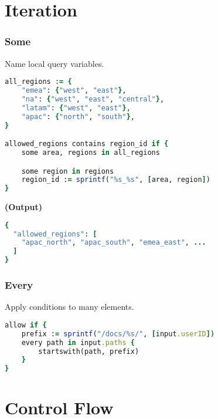 \documentclass[twocolumn]{article}
\begin{document}
\section*{Iteration  }




\vspace{-1em}
\subsubsection*{Some}


\footnotesize{Name local query variables.}


\begin{lstlisting}[language=Ruby]
all_regions := {
	"emea": {"west", "east"},
	"na": {"west", "east", "central"},
	"latam": {"west", "east"},
	"apac": {"north", "south"},
}

allowed_regions contains region_id if {
	some area, regions in all_regions

	some region in regions
	region_id := sprintf("%s_%s", [area, region])
}
\end{lstlisting}



\textbf{\tiny{(Output)}}
\begin{lstlisting}[language=Ruby]
{
  "allowed_regions": [
    "apac_north", "apac_south", "emea_east", ...
  ]
}
\end{lstlisting}



\vspace{-1em}
\subsubsection*{Every}


\footnotesize{Apply conditions to many elements.}


\begin{lstlisting}[language=Ruby]
allow if {
	prefix := sprintf("/docs/%s/", [input.userID])
	every path in input.paths {
		startswith(path, prefix)
	}
}
\end{lstlisting}









\section*{Control Flow  }
\end{document}
